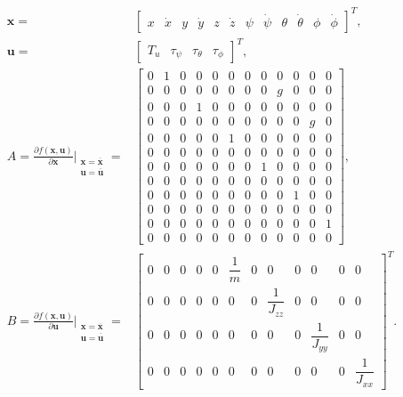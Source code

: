 \begin{align}
\begin{split}
\mathbf{x} = & \begin{bmatrix}
x & \dot{x} & y & \dot{y} & z & \dot{z} & \psi & \dot{\psi} & \theta & \dot{\theta} & \phi & \dot{\phi}
\end{bmatrix}^{T},\\[15px]
\mathbf{u} = & \begin{bmatrix}
T_u & \tau_\psi & \tau_\theta & \tau_\phi
\end{bmatrix}^{T},\\[15px]
A  = \frac{\partial f(\mathbf{x},\mathbf{u})}{\partial \mathbf{x}}\Bigr|_{\substack{\mathbf{x}=\overline{\mathbf{x}}\\\mathbf{u}=\overline{\mathbf{u}}}} = & 
\begin{bmatrix}
0 & 1 & 0 & 0 & 0 & 0 & 0 & 0 & 0 & 0 & 0 & 0\\[2px]
0 & 0 & 0 & 0 & 0 & 0 & 0 & 0 & g & 0 & 0 & 0\\[2px]
0 & 0 & 0 & 1 & 0 & 0 & 0 & 0 & 0 & 0 & 0 & 0\\[2px]
0 & 0 & 0 & 0 & 0 & 0 & 0 & 0 & 0 & 0 & g & 0\\[2px]
0 & 0 & 0 & 0 & 0 & 1 & 0 & 0 & 0 & 0 & 0 & 0\\[2px]
0 & 0 & 0 & 0 & 0 & 0 & 0 & 0 & 0 & 0 & 0 & 0\\[2px]
0 & 0 & 0 & 0 & 0 & 0 & 0 & 1 & 0 & 0 & 0 & 0\\[2px]
0 & 0 & 0 & 0 & 0 & 0 & 0 & 0 & 0 & 0 & 0 & 0\\[2px]
0 & 0 & 0 & 0 & 0 & 0 & 0 & 0 & 0 & 1 & 0 & 0\\[2px]
0 & 0 & 0 & 0 & 0 & 0 & 0 & 0 & 0 & 0 & 0 & 0\\[2px]
0 & 0 & 0 & 0 & 0 & 0 & 0 & 0 & 0 & 0 & 0 & 1\\[2px]
0 & 0 & 0 & 0 & 0 & 0 & 0 & 0 & 0 & 0 & 0 & 0
\end{bmatrix}, \\[15px]
B = \frac{\partial f(\mathbf{x},\mathbf{u})}{\partial \mathbf{u}}\Bigr|_{\substack{\mathbf{x}=\overline{\mathbf{x}}\\\mathbf{u}=\overline{\mathbf{u}}}} = & 
\begin{bmatrix}
0 & 0 & 0 & 0 & 0 & \dfrac{1}{m} & 0 & 0 & 0 & 0 & 0 & 0\\[5px]
0 & 0 & 0 & 0 & 0 & 0 & 0 & \dfrac{1}{J_{zz}} & 0 & 0 & 0 & 0\\[5px]
0 & 0 & 0 & 0 & 0 & 0 & 0 & 0 & 0 & \dfrac{1}{J_{yy}} & 0 & 0\\[5px]
0 & 0 & 0 & 0 & 0 & 0 & 0 & 0 & 0 & 0 & 0 & \dfrac{1}{J_{xx}}
\end{bmatrix}^{T}.
\end{split}
\end{align}

